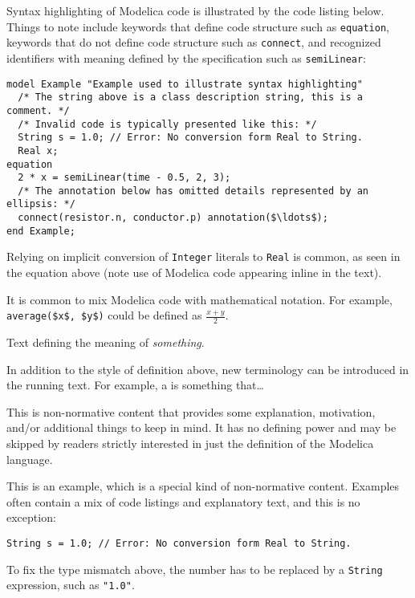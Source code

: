 Syntax highlighting of Modelica code is illustrated by the code listing below.
Things to note include keywords that define code structure such as \lstinline!equation!, keywords that do not define code structure such as \lstinline!connect!, and recognized identifiers with meaning defined by the specification such as \lstinline!semiLinear!:
\begin{lstlisting}[language=modelica]
model Example "Example used to illustrate syntax highlighting"
  /* The string above is a class description string, this is a comment. */
  /* Invalid code is typically presented like this: */
  String s = 1.0; // Error: No conversion form Real to String.
  Real x;
equation
  2 * x = semiLinear(time - 0.5, 2, 3);
  /* The annotation below has omitted details represented by an ellipsis: */
  connect(resistor.n, conductor.p) annotation($\ldots$);
end Example;
\end{lstlisting}

Relying on implicit conversion of \lstinline!Integer! literals to \lstinline!Real! is common, as seen in the equation above (note use of Modelica code appearing inline in the text).

It is common to mix Modelica code with mathematical notation.
For example, \lstinline!average($x$, $y$)! could be defined as $\frac{x + y}{2}$.

\begin{definition}[Something]%
Text defining the meaning of \emph{something}.
\end{definition}

In addition to the style of definition above, new terminology can be introduced in the running text.
For example, a  is something that\ldots

\begin{nonnormative}
This is non-normative content that provides some explanation, motivation, and/or additional things to keep in mind.
It has no defining power and may be skipped by readers strictly interested in just the definition of the Modelica language.
\end{nonnormative}

\begin{example}
This is an example, which is a special kind of non-normative content.
Examples often contain a mix of code listings and explanatory text, and this is no exception:
\begin{lstlisting}[language=modelica]
String s = 1.0; // Error: No conversion form Real to String.
\end{lstlisting}
To fix the type mismatch above, the number has to be replaced by a \lstinline!String! expression, such as \lstinline!"1.0"!.
\end{example}

